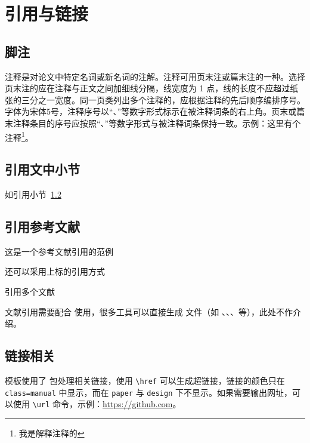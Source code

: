 
\chapter{引用与链接}

\section{脚注}
注释是对论文中特定名词或新名词的注解。注释可用页末注或篇末注的一种。选择页末注的应在注释与正文之间加细线分隔，线宽度为 1 点，线的长度不应超过纸张的三分之一宽度。同一页类列出多个注释的，应根据注释的先后顺序编排序号。字体为宋体5号，注释序号以“、”等数字形式标示在被注释词条的右上角。页末或篇末注释条目的序号应按照“、”等数字形式与被注释词条保持一致。示例：这里有个注释\footnote{我是解释注释的}。

\section{引用文中小节}\label{sec:ref}
如引用小节~\ref{sec:ref}

\section{引用参考文献}
这是一个参考文献引用的范例\cite{kuhn2004man}

还可以采用上标的引用方式

引用多个文献\cite{kuhn2004man,江泽民2008新时期我国信息技术产业的发展,江泽民1989能源发展趋势及主要节能措施}

文献引用需要配合  使用，很多工具可以直接生成  文件（如 、、、等），此处不作介绍。

\section{链接相关}
模板使用了  包处理相关链接，使用 \verb|\href| 可以生成超链接，链接的颜色只在 \verb|class=manual| 中显示，而在 \verb|paper| 与 \verb|design| 下不显示。如果需要输出网址，可以使用 \verb|\url| 命令，示例：\url{https://github.com}。
